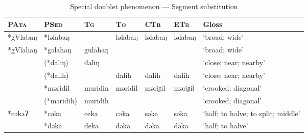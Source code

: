 \documentclass[12pt]{article}
\newcommand{\pata}{\textsc{PAta}\xspace}
\newcommand{\psed}{\textsc{PSed}\xspace}
\newcommand{\stg}{\textsc{Tg}\xspace}
\newcommand{\sto}{\textsc{To}\xspace}
\newcommand{\sctr}{\textsc{CTr}\xspace}
\newcommand{\setr}{\textsc{ETr}\xspace}
\begin{document}
\begin{table}[!htbp]
\centering
\caption{Special doublet phenomenon --- Segment substitution}
\label{tab:gender2}
\begin{tabular}{lllllll}
\hline
\pata & \psed    & \stg    & \sto    & \sctr   & \setr   & Gloss               \\ \hline
*gVlabaŋ & *ləlabaŋ &         & ləlabaŋ & ləlabaŋ & ləlabaŋ & `broad; wide'         \\
*gVlahaŋ & *gəlahaŋ & gulahaŋ &         &         &         & `broad; wide'         \\
 & (*daliŋ)   & daliŋ   &         &         &         & `close; near; nearby' \\
 & (*dalih)   &         & dalih   & dalih   & dalih   & `close; near; nearby' \\
 & *məridil & muridin & məridil & məriɟil & məriɟil & `crooked; diagonal'  \\
 & (*məridih) & muridih &         &         &         & `crooked; diagonal'   \\
*cəkaʔ & *cəka    & ceka    & cəka    & səka    & səka    & `half; to halve; to split; middle'     \\
 & *dəka    & deka    & dəka    & dəka    & dəka    & `half; to halve'     \\ \hline  
\end{tabular}
\end{table}
\end{document}
